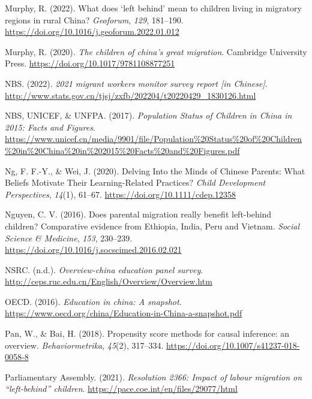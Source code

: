 \documentclass[
  man,floatsintext]{apa7}
\newlength{\cslhangindent}
\newlength{\cslentryspacingunit} %
\newenvironment{CSLReferences}[2] %
 {%
  \setlength{\parindent}{0pt}
  \ifodd #1
  \let\oldpar\par
  \def\par{\hangindent=\cslhangindent\oldpar}
  \fi
  \setlength{\parskip}{#2\cslentryspacingunit}
 }%
 {}
\begin{document}
\begin{CSLReferences}{1}{0}
\leavevmode{}%
Murphy, R. (2022). What does {`}left behind{'} mean to children living in migratory regions in rural China? \emph{Geoforum}, \emph{129}, 181--190. \url{https://doi.org/10.1016/j.geoforum.2022.01.012}

\leavevmode{}%
Murphy, R. (2020). \emph{The children of china{'}s great migration}. Cambridge University Press. \url{https://doi.org/10.1017/9781108877251}

\leavevmode{}%
NBS. (2022). \emph{2021 migrant workers monitor survey report {[}in Chinese{]}}. \url{http://www.stats.gov.cn/tjsj/zxfb/202204/t20220429_1830126.html}

\leavevmode{}%
NBS, UNICEF, \& UNFPA. (2017). \emph{Population Status of Children in China in 2015: Facts and Figures}. \url{https://www.unicef.cn/media/9901/file/Population\%20Status\%20of\%20Children\%20in\%20China\%20in\%202015\%20Facts\%20and\%20Figures.pdf}

\leavevmode{}%
Ng, F. F.-Y., \& Wei, J. (2020). Delving Into the Minds of Chinese Parents: What Beliefs Motivate Their Learning-Related Practices? \emph{Child Development Perspectives}, \emph{14}(1), 61--67. \url{https://doi.org/10.1111/cdep.12358}

\leavevmode{}%
Nguyen, C. V. (2016). Does parental migration really benefit left-behind children? Comparative evidence from Ethiopia, India, Peru and Vietnam. \emph{Social Science \& Medicine}, \emph{153}, 230--239. \url{https://doi.org/10.1016/j.socscimed.2016.02.021}

\leavevmode{}%
NSRC. (n.d.). \emph{Overview-china education panel survey}. \url{http://ceps.ruc.edu.cn/English/Overview/Overview.htm}

\leavevmode{}%
OECD. (2016). \emph{Education in china: A snapshot}. \url{https://www.oecd.org/china/Education-in-China-a-snapshot.pdf}

\leavevmode{}%
Pan, W., \& Bai, H. (2018). Propensity score methods for causal inference: an overview. \emph{Behaviormetrika}, \emph{45}(2), 317--334. \url{https://doi.org/10.1007/s41237-018-0058-8}

\leavevmode{}%
Parliamentary Assembly. (2021). \emph{Resolution 2366: Impact of labour migration on {``}left-behind{''} children}. \url{https://pace.coe.int/en/files/29077/html}


\end{CSLReferences}
\end{document}
